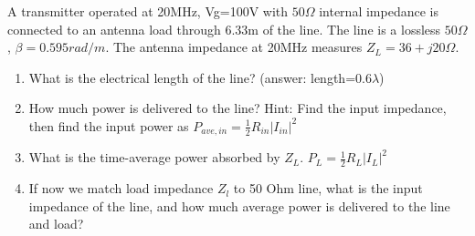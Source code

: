 \documentclass{ximera}
\begin{document}
\begin{example}
A transmitter operated at 20MHz, Vg=100V with $50 \Omega$ internal impedance is connected to an antenna load through 6.33m of the line. The line is a lossless $50 \Omega$, $\beta=0.595rad/m$. The antenna impedance at 20MHz measures $Z_L=36+j20 \Omega$. 
\begin{enumerate}
\item What is the electrical length of the line? (answer: length=0.6$\lambda$)
\item How much power is delivered to the line? Hint: Find the input impedance, then find the input power as $P_{ave,in}=\frac{1}{2}R_{in} |I_{in}|^2$
\item What is the time-average power absorbed by $Z_L$. $P_{L}=\frac{1}{2} R_L |I_{L}|^2$
\item If now we match load impedance $Z_l$ to 50 Ohm line, what is the input impedance of the line, and how much average power is delivered to the line and load?
\end{enumerate}

\end{example}
\end{document}
